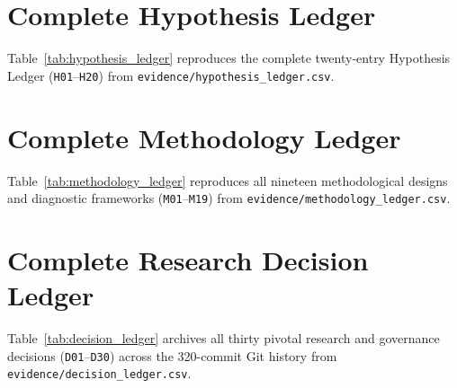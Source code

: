 \chapter{Complete Hypothesis Ledger}\label{app:hypothesis_ledger}
Table~\ref{tab:hypothesis_ledger} reproduces the complete twenty-entry Hypothesis Ledger (\texttt{H01}--\texttt{H20}) from \texttt{evidence/hypothesis\_ledger.csv}.



\chapter{Complete Methodology Ledger}\label{app:methodology_ledger}
Table~\ref{tab:methodology_ledger} reproduces all nineteen methodological designs and diagnostic frameworks (\texttt{M01}--\texttt{M19}) from \texttt{evidence/methodology\_ledger.csv}.



\chapter{Complete Research Decision Ledger}\label{app:decision_ledger}
Table~\ref{tab:decision_ledger} archives all thirty pivotal research and governance decisions (\texttt{D01}--\texttt{D30}) across the 320-commit Git history from \texttt{evidence/decision\_ledger.csv}.



